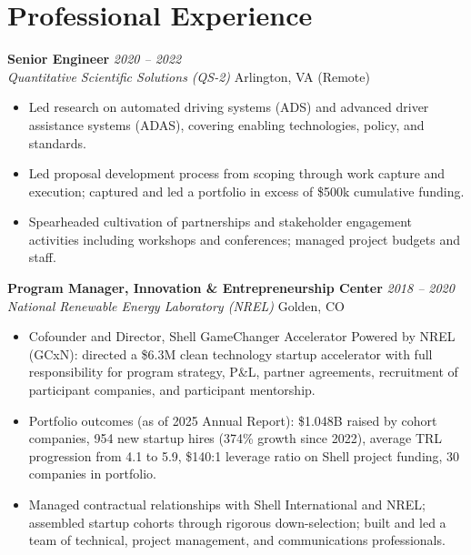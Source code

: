 \documentclass[11pt,letterpaper]{article}
\newcommand{\cventry}[4]{%
  \noindent\textbf{#1} \hfill \textit{#2}\\
  \textit{#3} \hfill #4\vspace{3pt}}
\begin{document}
\section{Professional Experience}

\cventry{Senior Engineer}{2020 -- 2022}
  {Quantitative Scientific Solutions (QS-2)}{Arlington, VA (Remote)}
\begin{itemize}
  \item Led research on automated driving systems (ADS) and advanced driver assistance
        systems (ADAS), covering enabling technologies, policy, and standards.
  \item Led proposal development process from scoping through work capture and execution;
        captured and led a portfolio in excess of \$500k cumulative funding.
  \item Spearheaded cultivation of partnerships and stakeholder engagement activities
        including workshops and conferences; managed project budgets and staff.
\end{itemize}

\medskip
\cventry{Program Manager, Innovation \& Entrepreneurship Center}{2018 -- 2020}
  {National Renewable Energy Laboratory (NREL)}{Golden, CO}
\begin{itemize}
  \item Cofounder and Director, Shell GameChanger Accelerator Powered by NREL (GCxN):
        directed a \$6.3M clean technology startup accelerator with full responsibility
        for program strategy, P\&L, partner agreements, recruitment of participant
        companies, and participant mentorship.
  \item Portfolio outcomes (as of 2025 Annual Report): \$1.048B raised by cohort companies,
        954 new startup hires (374\% growth since 2022), average TRL progression from 4.1 to 5.9,
        \$140:1 leverage ratio on Shell project funding, 30 companies in portfolio.
  \item Managed contractual relationships with Shell International and NREL; assembled
        startup cohorts through rigorous down-selection; built and led a team of
        technical, project management, and communications professionals.
\end{itemize}
\end{document}
